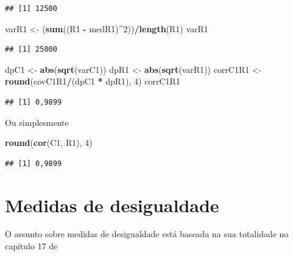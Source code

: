 \documentclass[
]{book}
\newenvironment{Shaded}{\begin{snugshade}}{\end{snugshade}}
\newcommand{\DecValTok}[1]{\textcolor[rgb]{0.00,0.00,0.81}{#1}}
\newcommand{\KeywordTok}[1]{\textcolor[rgb]{0.13,0.29,0.53}{\textbf{#1}}}
\newcommand{\NormalTok}[1]{#1}
\newcommand{\OperatorTok}[1]{\textcolor[rgb]{0.81,0.36,0.00}{\textbf{#1}}}
\newcommand{\StringTok}[1]{\textcolor[rgb]{0.31,0.60,0.02}{#1}}
\begin{document}
\begin{verbatim}
## [1] 12500
\end{verbatim}

\begin{Shaded}
\begin{Highlighting}[]
\NormalTok{varR1 <-}\StringTok{ }\NormalTok{(}\KeywordTok{sum}\NormalTok{((R1 }\OperatorTok{-}\StringTok{ }\NormalTok{medR1)}\OperatorTok{^}\DecValTok{2}\NormalTok{))}\OperatorTok{/}\KeywordTok{length}\NormalTok{(R1)}
\NormalTok{varR1}
\end{Highlighting}
\end{Shaded}

\begin{verbatim}
## [1] 25000
\end{verbatim}

\begin{Shaded}
\begin{Highlighting}[]
\NormalTok{dpC1 <-}\StringTok{ }\KeywordTok{abs}\NormalTok{(}\KeywordTok{sqrt}\NormalTok{(varC1))}
\NormalTok{dpR1 <-}\StringTok{ }\KeywordTok{abs}\NormalTok{(}\KeywordTok{sqrt}\NormalTok{(varR1))}
\NormalTok{corrC1R1 <-}\StringTok{ }\KeywordTok{round}\NormalTok{(covC1R1}\OperatorTok{/}\NormalTok{(dpC1 }\OperatorTok{*}\StringTok{ }\NormalTok{dpR1), }\DecValTok{4}\NormalTok{)}
\NormalTok{corrC1R1}
\end{Highlighting}
\end{Shaded}

\begin{verbatim}
## [1] 0,9899
\end{verbatim}

Ou simplesmente

\begin{Shaded}
\begin{Highlighting}[]
\KeywordTok{round}\NormalTok{(}\KeywordTok{cor}\NormalTok{(C1, R1), }\DecValTok{4}\NormalTok{)}
\end{Highlighting}
\end{Shaded}

\begin{verbatim}
## [1] 0,9899
\end{verbatim}

\hypertarget{medidas-de-desigualdade}{%
\chapter{Medidas de desigualdade}\label{medidas-de-desigualdade}}

O assunto sobre medidas de desigualdade está baseada na sua totalidade no capítulo 17 de \citet{Hoffmann2016}
\end{document}
